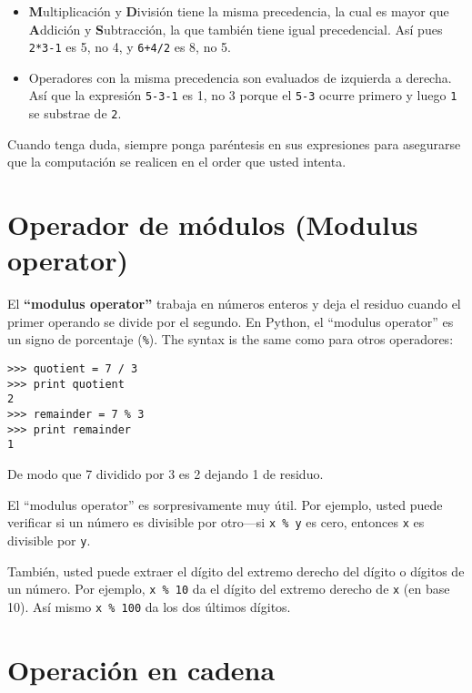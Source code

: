 \begin{ex}
\begin{itemize}
\item {\bf M}ultiplicaci\'on y {\bf D}ivisi\'on tiene la misma precedencia,
la cual es mayor que {\bf A}ddici\'on y {\bf S}ubtracci\'on, la que tambi\'en tiene igual precedencial. As\'i pues {\tt 2*3-1} es 5, no 4, y
{\tt 6+4/2} es 8, no 5.

\item Operadores con la misma precedencia son evaluados de izquierda a derecha. As\'i que la expresi\'on {\tt 5-3-1} es 1, no 3 porque el 
{\tt 5-3} ocurre primero y luego {\tt 1} se substrae de {\tt 2}.

\end{itemize}

Cuando tenga duda, siempre ponga par\'entesis en sus expresiones para asegurarse que la computaci\'on se realicen en el order que usted intenta.

\section{Operador de m\'odulos (Modulus operator)}






El {\bf ``modulus operator''} trabaja en n\'umeros enteros y deja el residuo cuando el primer operando se divide por el segundo. En Python, el 
``modulus operator'' es un signo de porcentaje (\verb"%").  The syntax is the same
como para otros operadores:


\beforeverb
\begin{verbatim}
>>> quotient = 7 / 3
>>> print quotient
2
>>> remainder = 7 % 3
>>> print remainder
1
\end{verbatim}
\afterverb
%

De modo que 7 dividido por 3 es 2 dejando 1 de residuo.

El ``modulus operator'' es sorpresivamente muy \'util. Por ejemplo, usted puede verificar si un n\'umero es divisible por otro---si
{\tt x \% y} es cero, entonces {\tt x} es divisible por {\tt y}.


Tambi\'en, usted puede extraer el d\'igito del extremo derecho del d\'igito o d\'igitos de un n\'umero. Por ejemplo, {\tt x \% 10} da el d\'igito del extremo derecho de {\tt x} (en base 10).  As\'i mismo {\tt x \% 100}
da los dos \'ultimos d\'igitos.



\section{Operaci\'on en cadena}


\end{ex}
